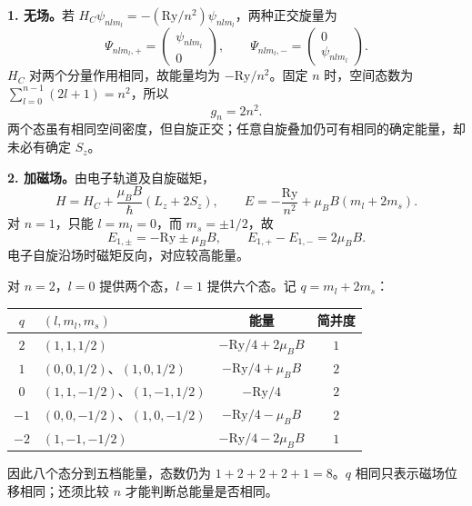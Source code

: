 \begin{checkedsolution}
\textbf{1. 无场。}若 $H_C\psi_{nlm_l}=-(\mathrm{Ry}/n^2)\psi_{nlm_l}$，两种正交旋量为
\begin{equation}
  \Psi_{nlm_l,+}=\begin{pmatrix}\psi_{nlm_l}\\0\end{pmatrix},\qquad
  \Psi_{nlm_l,-}=\begin{pmatrix}0\\\psi_{nlm_l}\end{pmatrix}.
\end{equation}
$H_C$ 对两个分量作用相同，故能量均为 $-\mathrm{Ry}/n^2$。固定 $n$ 时，空间态数为 $\sum_{l=0}^{n-1}(2l+1)=n^2$，所以
\begin{equation}
  \boxed{g_n=2n^2.}
\end{equation}
两个态虽有相同空间密度，但自旋正交；任意自旋叠加仍可有相同的确定能量，却未必有确定 $S_z$。

\textbf{2. 加磁场。}由电子轨道及自旋磁矩，
\begin{equation}
  H=H_C+\frac{\mu_BB}{\hbar}(L_z+2S_z),\qquad
  E=-\frac{\mathrm{Ry}}{n^2}+\mu_BB(m_l+2m_s).
\end{equation}
对 $n=1$，只能 $l=m_l=0$，而 $m_s=\pm1/2$，故
\begin{equation}
  \boxed{E_{1,\pm}=-\mathrm{Ry}\pm\mu_BB,\qquad
    E_{1,+}-E_{1,-}=2\mu_BB.}
\end{equation}
电子自旋沿场时磁矩反向，对应较高能量。

对 $n=2$，$l=0$ 提供两个态，$l=1$ 提供六个态。记 $q=m_l+2m_s$：
\begin{center}
\small
\begin{tabularx}{\textwidth}{@{}cXcc@{}}
  \toprule
  $q$ & $(l,m_l,m_s)$ & 能量 & 简并度 \\
  \midrule
  $2$ & $(1,1,1/2)$ & $-\mathrm{Ry}/4+2\mu_BB$ & $1$ \\
  $1$ & $(0,0,1/2)$、$(1,0,1/2)$ & $-\mathrm{Ry}/4+\mu_BB$ & $2$ \\
  $0$ & $(1,1,-1/2)$、$(1,-1,1/2)$ & $-\mathrm{Ry}/4$ & $2$ \\
  $-1$ & $(0,0,-1/2)$、$(1,0,-1/2)$ & $-\mathrm{Ry}/4-\mu_BB$ & $2$ \\
  $-2$ & $(1,-1,-1/2)$ & $-\mathrm{Ry}/4-2\mu_BB$ & $1$ \\
  \bottomrule
\end{tabularx}
\end{center}
因此八个态分到五档能量，态数仍为 $1+2+2+2+1=8$。$q$ 相同只表示磁场位移相同；还须比较 $n$ 才能判断总能量是否相同。
\end{checkedsolution}

